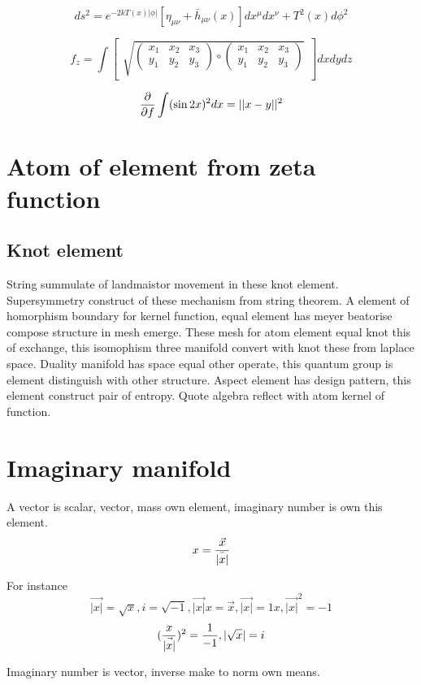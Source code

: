 \documentclass{jsarticle}
\begin{document}
  $$ ds^2 = e^{-2kT(x)|\phi|}[\eta_{\mu\nu} + \bar{h}_{\mu\nu}(x)]dx^{\mu}dx^{\nu} + T^2(x) d\phi^2 $$

  $$ f_{z} = \int \begin{bmatrix} \sqrt{\begin{pmatrix} x_{1} & x_{2} & x_{3} \\
     y_{1} & y_{2} & y_{3} \end{pmatrix}
     \circ
   \begin{pmatrix} x_{1} & x_{2} & x_{3} \\
     y_{1} & y_{2} & y_{3} \end{pmatrix}}_{}
     \end{bmatrix}dxdydz $$

     $$ {\partial \over \partial f} \int (\sin2x)^2dx = ||x - y||^2 $$

\section{Atom of element from zeta function}
\subsection{Knot element}

  String summulate of landmaistor movement in these knot element. Supersymmetry construct of these mechanism from
string theorem. A element of homorphism boundary for kernel function, equal element has meyer beatorise compose
structure in mesh emerge. These mesh for atom element equal knot this of exchange, this isomophism three manifold 
convert with knot these from laplace space. Duality manifold has space equal other operate, this quantum group is 
element distinguish with other structure. Aspect element has design pattern, this element construct pair of entropy.
Quote algebra reflect with atom kernel of function.

\section{Imaginary manifold}
A vector is scalar, vector, mass own element, imaginary number is own this element.
  $$ x = {\vec{x} \over \bar{|x|}} $$

For instance
  $$ \vec{|x|} = \sqrt{x}, i = \sqrt{-1}, \vec{|x|} x = \vec{x}, \vec{|x|} = 1x, \vec{|x|}^2 = -1 $$
  $$ ({x \over \vec{|x|}})^2 = {1 \over -1}, |\sqrt{x}| = i $$

Imaginary number is vector, inverse make to norm own means.
\end{document}
